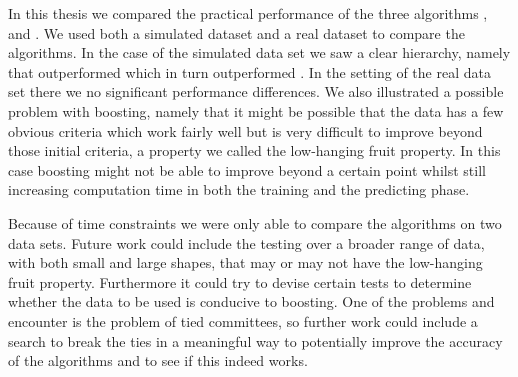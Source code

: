In this thesis we compared the practical performance of the three algorithms \adaB, \NHB and \squintB.  We used both a simulated dataset and a real dataset to compare the algorithms. In the case of the simulated data set we saw a clear hierarchy, namely that \NHB outperformed \adaB which in turn outperformed \squintB. In the setting of the real data set  there we no significant performance differences.
We also illustrated a possible problem with boosting, namely that it might be possible that the data has a few obvious criteria which work fairly well but is very difficult to improve beyond those initial criteria, a property we called the low-hanging fruit property. In this case boosting might not be able to improve beyond a certain point whilst still increasing computation time in both the training and the predicting phase. 

\par Because of time constraints we were only able to compare the algorithms on two data sets. Future work could include the testing over a broader range of data, with both small and large shapes, that may or may not have the low-hanging fruit property. Furthermore it could try to devise certain tests to determine whether the data to be used is conducive to boosting. One of the problems \squintB and \NHB encounter is the problem of tied committees, so further work could include a search to break the ties in a meaningful way to potentially improve the accuracy of the algorithms and to see if this indeed works. 

